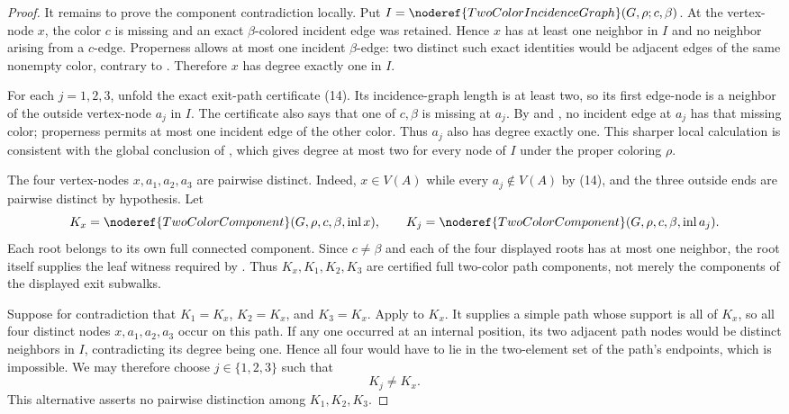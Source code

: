 \begin{proof}
It remains to prove the component contradiction locally.  Put
$I=\noderef{TwoColorIncidenceGraph}(G,\rho;c,\beta)$.  At the vertex-node
$x$, the color $c$ is missing and an exact $\beta$-colored incident edge
was retained.  Hence $x$ has at least one neighbor in $I$ and no neighbor
arising from a $c$-edge.  Properness allows at most one incident
$\beta$-edge: two distinct such exact identities would be adjacent edges
of the same nonempty color, contrary to
.  Therefore $x$ has degree exactly one in
$I$.

For each $j=1,2,3$, unfold the exact exit-path certificate (14).  Its
incidence-graph length is at least two, so its first edge-node is a
neighbor of the outside vertex-node $a_j$ in $I$.  The certificate also
says that one of $c,\beta$ is missing at $a_j$.  By
 and , no incident edge at
$a_j$ has that missing color; properness permits at most one incident edge
of the other color.  Thus $a_j$ also has degree exactly one.  This sharper
local calculation is consistent with the global conclusion of
, which gives degree at most two
for every node of $I$ under the proper coloring $\rho$.

The four vertex-nodes $x,a_1,a_2,a_3$ are pairwise distinct.  Indeed,
$x\in V(A)$ while every $a_j\notin V(A)$ by (14), and the three outside
ends are pairwise distinct by hypothesis.  Let
\[
 K_x=\noderef{TwoColorComponent}(G,\rho,c,\beta,\operatorname{inl}x),
 \qquad
 K_j=\noderef{TwoColorComponent}(G,\rho,c,\beta,\operatorname{inl}a_j).
\]
Each root belongs to its own full connected component.  Since
$c\ne\beta$ and each of the four displayed roots has at most one neighbor,
the root itself supplies the leaf witness required by
.  Thus $K_x,K_1,K_2,K_3$ are certified
full two-color path components, not merely the components of the displayed
exit subwalks.

Suppose for contradiction that $K_1=K_x$, $K_2=K_x$, and $K_3=K_x$.
Apply  to $K_x$.  It supplies a
simple path whose support is all of $K_x$, so all four distinct nodes
$x,a_1,a_2,a_3$ occur on this path.  If any one occurred at an internal
position, its two adjacent path nodes would be distinct neighbors in $I$,
contradicting its degree being one.  Hence all four would have to lie in
the two-element set of the path's endpoints, which is impossible.  We may
therefore choose $j\in\{1,2,3\}$ such that
\[
                              K_j\ne K_x.                       \tag{15}
\]
This alternative asserts no pairwise distinction among $K_1,K_2,K_3$.


\end{proof}
